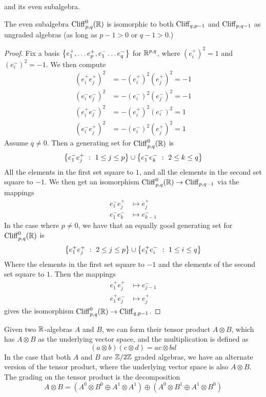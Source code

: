 and its even subalgebra.
%
\begin{thm}
The even subalgebra $\operatorname{Cliff}_{p,q}^0(\mathbb{R})$ is isomorphic to both $\operatorname{Cliff}_{q, p-1}$
and $\operatorname{Cliff}_{p,q-1}$ as ungraded algebras (as long as $p-1 > 0$ or $q-1 > 0$.)
\end{thm}
%
\begin{proof}
Fix a basis $\left\lbrace e_1^+, \ldots e_p^+, e_1^- \ldots e_q^- \right\rbrace$ for $\mathbb{R}^{p,q}$, where
$(e_i^+)^2 = 1$ and $(e_i^-)^2 = -1$. We then compute
%
\begin{align*}
(e_i^+e_j^+)^2 &= -(e_i^+)^2(e_j^+)^2 = -1 \\
(e_i^-e_j^-)^2 &= -(e_i^-)^2(e_j^-)^2 = -1 \\
(e_i^+e_j^-)^2 &= -(e_i^+)^2(e_i^-)^2 = 1 \\
(e_i^-e_j^+)^2 &= -(e_i^-)^2(e_j^+)^2 = 1
\end{align*}
%
Assume $q \neq 0$. Then a generating set for $\operatorname{Cliff}_{p,q}^0(\mathbb{R})$ is
\[
\left\lbrace e_1^-e_j^+ ~:~ 1 \leq j \leq p \right\rbrace \cup \left\lbrace e_1^-e_k^- ~:~ 2 \leq k \leq q \right\rbrace
\]
All the elements in the first set square to $1$, and all the elements in the
second set square to $-1$. We then get an isomorphism
$\operatorname{Cliff}^0_{p,q}(\mathbb{R}) \to \operatorname{Cliff}_{p,q-1}$ via the mappings
\begin{align*}
e_1^-e_j^+ &\mapsto e_j^+ \\
e_1^-e_k^- &\mapsto e_{k-1}^-
\end{align*}
In the case where $p \neq 0$, we have that an equally good generating set for
$\operatorname{Cliff}_{p,q}^0(\mathbb{R})$ is
\[
\left\lbrace e^+_1e_j^+ ~:~ 2 \leq j \leq p \right\rbrace \cup \left\lbrace e_1^+e_i^- ~:~ 1 \leq i \leq q \right\rbrace
\]
Where the elements in the first set square to $-1$ and the elements of the second
set square to $1$. Then the mappings
\begin{align*}
e_1^+e_j^+ &\mapsto e_{j-1}^- \\
e_1^+e_j^- &\mapsto e_j^+
\end{align*}
gives the isomorphism $\operatorname{Cliff}_{p,q}^0(\mathbb{R}) \to \operatorname{Cliff}_{q, p-1}$.
\end{proof}
%
Given two $\mathbb{R}$-algebras $A$ and $B$, we can form their tensor product
$A \otimes B$, which has $A \otimes B$ as the underlying vector space, and the
multiplication is defined as
\[
(a \otimes b)(c \otimes d) = ac \otimes bd
\]
In the case that both $A$ and $B$ are $\mathbb{Z}/2\mathbb{Z}$ graded algebras, we have an alternate
version of the tensor product, where the underlying vector space is also
$A \otimes B$. The grading on the tensor product is the decomposition
\[
A \otimes B = (A^0 \otimes B^0 \oplus A^1 \otimes A^1) \oplus (A^0 \otimes B^1
\oplus A^1 \otimes B^0)
\]
